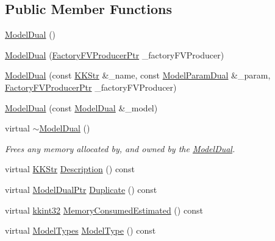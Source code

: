 \subsection*{Public Member Functions}
\begin{DoxyCompactItemize}
\item 
\hyperlink{class_k_k_m_l_l_1_1_model_dual_a9320d335eb52a8d948626f2fe2bb10d6}{Model\+Dual} ()
\item 
\hyperlink{class_k_k_m_l_l_1_1_model_dual_a097df4f52cb3586127dee764cabe8db2}{Model\+Dual} (\hyperlink{namespace_k_k_m_l_l_a82812d1feb85a6cff72d059bc67bb90e}{Factory\+F\+V\+Producer\+Ptr} \+\_\+factory\+F\+V\+Producer)
\item 
\hyperlink{class_k_k_m_l_l_1_1_model_dual_a5b39e2de992d7ce7987b7d9cd0903278}{Model\+Dual} (const \hyperlink{class_k_k_b_1_1_k_k_str}{K\+K\+Str} \&\+\_\+name, const \hyperlink{class_k_k_m_l_l_1_1_model_param_dual}{Model\+Param\+Dual} \&\+\_\+param, \hyperlink{namespace_k_k_m_l_l_a82812d1feb85a6cff72d059bc67bb90e}{Factory\+F\+V\+Producer\+Ptr} \+\_\+factory\+F\+V\+Producer)
\item 
\hyperlink{class_k_k_m_l_l_1_1_model_dual_a57c32467b3f84bda98fdae74152327f3}{Model\+Dual} (const \hyperlink{class_k_k_m_l_l_1_1_model_dual}{Model\+Dual} \&\+\_\+model)
\item 
virtual \hyperlink{class_k_k_m_l_l_1_1_model_dual_af34be493c74303e13bda8c39cdd2a892}{$\sim$\+Model\+Dual} ()
\begin{DoxyCompactList}\small\item\em Frees any memory allocated by, and owned by the \hyperlink{class_k_k_m_l_l_1_1_model_dual}{Model\+Dual}. \end{DoxyCompactList}\item 
virtual \hyperlink{class_k_k_b_1_1_k_k_str}{K\+K\+Str} \hyperlink{class_k_k_m_l_l_1_1_model_dual_af55fd74d913948bbf659c64ac570be1a}{Description} () const 
\item 
virtual \hyperlink{class_k_k_m_l_l_1_1_model_dual_aa5c30e12d0d4eeed91d9fafc858544f4}{Model\+Dual\+Ptr} \hyperlink{class_k_k_m_l_l_1_1_model_dual_a610d68479783880a8f28f44041107302}{Duplicate} () const 
\item 
virtual \hyperlink{namespace_k_k_b_a8fa4952cc84fda1de4bec1fbdd8d5b1b}{kkint32} \hyperlink{class_k_k_m_l_l_1_1_model_dual_a240e7417fd03f940fea74696d5f3278a}{Memory\+Consumed\+Estimated} () const 
\item 
virtual \hyperlink{class_k_k_m_l_l_1_1_model_aeda4060e088c67446ca993eefcecea06}{Model\+Types} \hyperlink{class_k_k_m_l_l_1_1_model_dual_a6499e4b4299858973ee603be4a0fe7cd}{Model\+Type} () const 

\end{DoxyCompactItemize}
